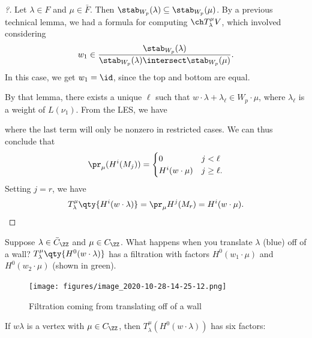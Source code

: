 \begin{proof}[?]

Let \(\lambda \in F\) and \(\mu\in\bar{F}\). Then
\(\stab_{W_p}(\lambda) \subseteq \stab_{W_p}(\mu)\). By a previous
technical lemma, we had a formula for computing \(\ch T_\lambda^\mu V\),
which involved considering
\begin{align*}  
w_1 \in {\stab_{W_p}(\lambda) \over \stab_{W_p}(\lambda) \intersect \stab_{W_p}(\mu)}
.\end{align*} In this case, we get \(w_1 = \id\), since the top and
bottom are equal.

By that lemma, there exists a unique \(\ell\) such that
\(w\cdot \lambda + \lambda_\ell \in W_p\cdot \mu\), where
\(\lambda_\ell\) is a weight of \(L(\nu_1)\). From the LES, we have

\begin{center}
\end{center}

where the last term will only be nonzero in restricted cases. We can
thus conclude that
\begin{align*}  
\pr_\mu(H^i(M_j))  =
\begin{cases}
0 & j< \ell \\
H^i(w\cdot \mu) & j\geq \ell.
\end{cases}
\end{align*} Setting \(j=r\), we have
\begin{align*}  
T_\lambda^\mu \qty{H^i(w\cdot\lambda)} = \pr_\mu H^j(M_r) = H^i(w\cdot \mu)
.\end{align*}

\end{proof}

Suppose \(\lambda \in \bar{C}_\ZZ\) and \(\mu \in C_\ZZ\). What happens
when you translate \(\lambda\) (blue) off of a wall?
\(T_\lambda^\mu\qty{H^0(w\cdot \lambda)}\) has a filtration with factors
\(H^0(w_1\cdot \mu)\) and \(H^0(w_2\cdot \mu)\) (shown in green).

\begin{figure}
\centering
\texttt{[image: figures/image\_2020-10-28-14-25-12.png]}
\caption{Filtration coming from translating off of a wall}
\end{figure}

If \(w\lambda\) is a vertex with \(\mu \in C_\ZZ\), then
\(T_\lambda^\mu(H^0(w\cdot \lambda))\) has six factors:

